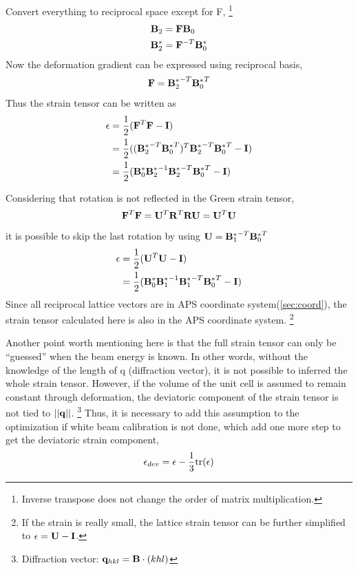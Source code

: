 \documentclass[12pt]{scrartcl}
\begin{document}
\begin{enumerate}
Convert everything to reciprocal space except for \tnsr F,
\footnote{Inverse transpose does not change the order of matrix multiplication.}
\begin{align*}
	\mathbf{B}_2 &= \mathbf{F} \mathbf{B}_0 \\
	\mathbf{B}^*_2 &= \mathbf{F}^{-T} \mathbf{B}_0^*
\end{align*}
Now the deformation gradient can be expressed using reciprocal basis,
\[
	\mathbf{F} = {\mathbf{B}_2^*}^{-T} {\mathbf{B}_0^*}^T
\]
Thus the strain tensor can be written as
\begin{align*}
	\epsilon &= \dfrac{1}{2} (\mathbf{F}^T\mathbf{F} - \mathbf{I}) \\
	              &= \dfrac{1}{2} ( ({\mathbf{B}_2^*}^{-T} {\mathbf{B}_0^*}^T)^T{\mathbf{B}_2^*}^{-T} {\mathbf{B}_0^*}^T - \mathbf{I}) \\
	              &= \dfrac{1}{2} ( \mathbf{B}_0^* {\mathbf{B}_2^*}^{-1} {\mathbf{B}_2^*}^{-T} {\mathbf{B}_0^*}^T  - \mathbf{I})
\end{align*}

Considering that rotation is not reflected in the Green strain tensor,
\[
	\mathbf{F}^T \mathbf{F} = \mathbf{U}^T \mathbf{R}^T \mathbf{R} \mathbf{U} = \mathbf{U}^T \mathbf{U}
\]
it is possible to skip the last rotation by using $\mathbf{U} =  {\mathbf{B}_1^*}^{-T} {\mathbf{B}_0^*}^T$
\begin{align*}
	\epsilon &=  \dfrac{1}{2} (\mathbf{U}^T\mathbf{U} - \mathbf{I}) \\
	              &=  \dfrac{1}{2} ( \mathbf{B}_0^* {\mathbf{B}_1^*}^{-1} {\mathbf{B}_1^*}^{-T} {\mathbf{B}_0^*}^T  - \mathbf{I})
\end{align*}
Since all reciprocal lattice vectors are in APS coordinate system(\cref{sec:coord}), the strain tensor calculated here is also in the APS coordinate system.
\footnote{If the strain is really small, the lattice strain tensor can be further simplified to $\epsilon = \mathbf{U} - \mathbf{I}$.} 

Another point worth mentioning here is that the full strain tensor can only be ``guessed'' when the beam energy is known.
In other words, without the knowledge of the length of \tnsr q (diffraction vector), it is not possible to inferred the whole strain tensor.
However, if the volume of the unit cell is assumed to remain constant through deformation, the deviatoric component of the strain tensor is not tied to $||\mathbf{q}||$.
\footnote{Diffraction vector: $\mathbf{q}_{hkl} = \mathbf{B} \cdot (khl) $}
Thus, it is necessary to add this assumption to the optimization if white beam calibration is not done, which add one more step to get the deviatoric strain component,
\[
	\mathbf{\epsilon}_{dev} = \mathbf{\epsilon} - \dfrac{1}{3}\text{tr}(\mathbf{\epsilon})
\]
\end{enumerate}
\end{document}
